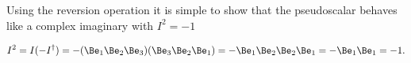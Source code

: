 %
%


Using the reversion operation it is simple to show that the  pseudoscalar
behaves like a complex imaginary with \( I^2 = -1 \)

\begin{dmath}\label{eqn:R3PseudoscalarSquare:3310}
I^2
=
I (-I^\dagger)
=
-
(\Be_1 \Be_2 \Be_3)(\Be_3 \Be_2 \Be_1)
=
-
\Be_1 \Be_2 \Be_2 \Be_1
=
-
\Be_1 \Be_1
=
-1.
\end{dmath}

